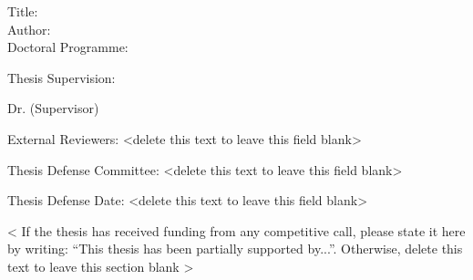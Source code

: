 
\begin{spacing}{1.3}
Title: \thesisTitle \\
Author: \thesisAuthor \\
Doctoral Programme:	 \DoctoralProgramme
\end{spacing}
Thesis Supervision: 
\begin{mydescription}
    \item Dr. \supervisorDetails  (Supervisor)
    \item \cosupervisorDetails
\end{mydescription}

\vspace{10 mm}
External Reviewers: <delete this text to leave this field blank>

\vspace{30 mm}

Thesis Defense Committee: <delete this text to leave this field blank>


\vspace{50mm}



Thesis Defense Date: <delete this text to leave this field blank>



\vspace{\fill}
\begin{spacing}{1.0}
< If the thesis has received funding from any competitive call, please state it here by writing: “This thesis has been partially supported by...”. Otherwise, delete this text to leave this section blank >
\end{spacing}

